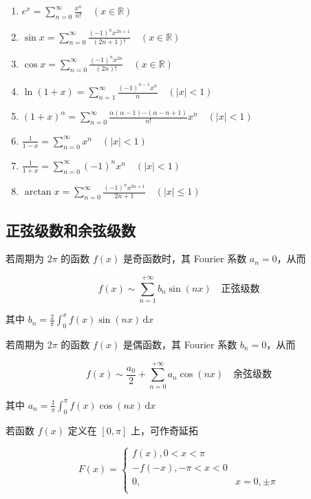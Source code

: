 \documentclass[lang = zh , final , oneside , openany , titlepage , zihao = -4 , linespread = 1.3 , baselineskip = false , cjk-font = windows , text-font = newtx , math-font = newtx , math-style = ISO , uppercase-greek = upright , integral-limits = false]{sjtureport}
\begin{document}
\begin{enumerate}
\item
  \(\displaystyle e^x = \sum_{n=0}^\infty \frac{x^n}{n!} \quad (x\in\mathbb{R})\)
\item
  \(\displaystyle \sin x = \sum_{n=0}^\infty \frac{(-1)^nx^{2n+1}}{(2n+1)!} \quad (x\in\mathbb{R})\)
\item
  \(\displaystyle \cos x = \sum_{n=0}^\infty \frac{(-1)^nx^{2n}}{(2n)!} \quad (x\in\mathbb{R})\)
\item
  \(\displaystyle \ln(1+x) = \sum_{n=1}^\infty \frac{(-1)^{n-1}x^n}{n} \quad (\left\vert x \right\vert<1)\)
\item
  \(\displaystyle (1+x)^\alpha = \sum_{n=0}^\infty \frac{\alpha(\alpha-1)\cdots(\alpha-n+1)}{n!}x^n \quad (\left\vert x\right\vert<1)\)
\item
  \(\displaystyle \frac{1}{1-x} = \sum_{n=0}^\infty x^n \quad (\left\vert x\right\vert<1)\)
\item
  \(\displaystyle \frac{1}{1+x} = \sum_{n=0}^\infty (-1)^nx^n \quad (\left\vert x\right\vert<1)\)
\item
  \(\displaystyle \arctan{x} = \sum_{n=0}^\infty \frac{(-1)^n x^{2n+1}}{2n+1} \quad (\left\vert x\right\vert\leq 1)\)
\end{enumerate}

\subsection{正弦级数和余弦级数}

若周期为 \(2\pi\) 的函数 \(f(x)\) 是奇函数时，其 Fourier 系数
\(a_n=0\)，从而

\[f(x) \sim \sum_{n=1}^{+\infty}b_n\sin(nx)\quad\text{正弦级数}\]

其中
\(\displaystyle b_n =\frac{2}{\pi}\int_0^\pi f(x)\sin(nx) \,\mathrm{d}x\)

若周期为 \(2\pi\) 的函数 \(f(x)\) 是偶函数，其 Fourier 系数
\(b_n=0\)，从而

\[f(x) \sim \frac{a_0}{2}+\sum_{n=0}^{+\infty}a_n\cos(nx)\quad\text{余弦级数}\]

其中
\(\displaystyle a_n =\frac{1}{\pi}\int_0^\pi f(x)\cos(nx) \,\mathrm{d}x\)

若函数 \(f(x)\) 定义在 \([0,\pi]\) 上，可作奇延拓

\[F(x)=
\begin{cases}
  f(x),  0< x< \pi\\
  -f(-x),  -\pi < x < 0\\
  0, & x=0,\pm\pi\\
\end{cases}\]
\end{document}
